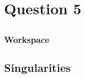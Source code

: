 \newpage
\section{Question 5}
	\subsection{}
		\subsubsection{Workspace}

	\pagebreak		
	\subsection{Singularities}
